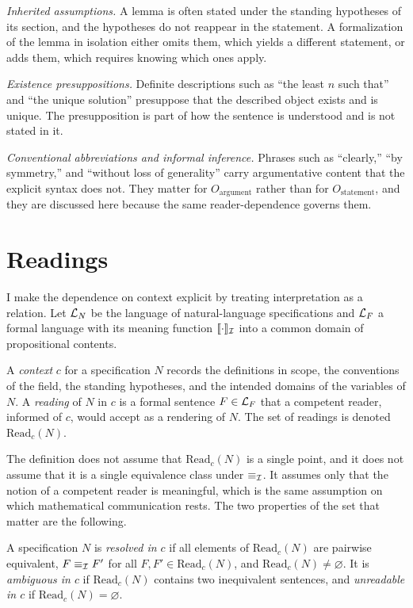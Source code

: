 \emph{Inherited assumptions.} A lemma is often stated under the standing hypotheses of its section, and the hypotheses do not reappear in the statement. A formalization of the lemma in isolation either omits them, which yields a different statement, or adds them, which requires knowing which ones apply.

\emph{Existence presuppositions.} Definite descriptions such as ``the least $n$ such that'' and ``the unique solution'' presuppose that the described object exists and is unique. The presupposition is part of how the sentence is understood and is not stated in it.

\emph{Conventional abbreviations and informal inference.} Phrases such as ``clearly,'' ``by symmetry,'' and ``without loss of generality'' carry argumentative content that the explicit syntax does not. They matter for $O_{\mathrm{argument}}$ rather than for $O_{\mathrm{statement}}$, and they are discussed here because the same reader-dependence governs them.

\section{Readings}

I make the dependence on context explicit by treating interpretation as a relation. Let $\mathcal{L}_N$ be the language of natural-language specifications and $\mathcal{L}_F$ a formal language with its meaning function $\llbracket\cdot\rrbracket_{\mathcal{I}}$ into a common domain of propositional contents.

\begin{definition}
\label{def:context}
A \emph{context} $c$ for a specification $N$ records the definitions in scope, the conventions of the field, the standing hypotheses, and the intended domains of the variables of $N$. A \emph{reading} of $N$ in $c$ is a formal sentence $F \in \mathcal{L}_F$ that a competent reader, informed of $c$, would accept as a rendering of $N$. The set of readings is denoted $\mathrm{Read}_c(N)$.
\end{definition}

The definition does not assume that $\mathrm{Read}_c(N)$ is a single point, and it does not assume that it is a single equivalence class under $\equiv_{\mathcal{I}}$. It assumes only that the notion of a competent reader is meaningful, which is the same assumption on which mathematical communication rests. The two properties of the set that matter are the following.

\begin{definition}
\label{def:resolved}
A specification $N$ is \emph{resolved in $c$} if all elements of $\mathrm{Read}_c(N)$ are pairwise equivalent, $F \equiv_{\mathcal{I}} F'$ for all $F, F' \in \mathrm{Read}_c(N)$, and $\mathrm{Read}_c(N) \neq \varnothing$. It is \emph{ambiguous in $c$} if $\mathrm{Read}_c(N)$ contains two inequivalent sentences, and \emph{unreadable in $c$} if $\mathrm{Read}_c(N) = \varnothing$.
\end{definition}

